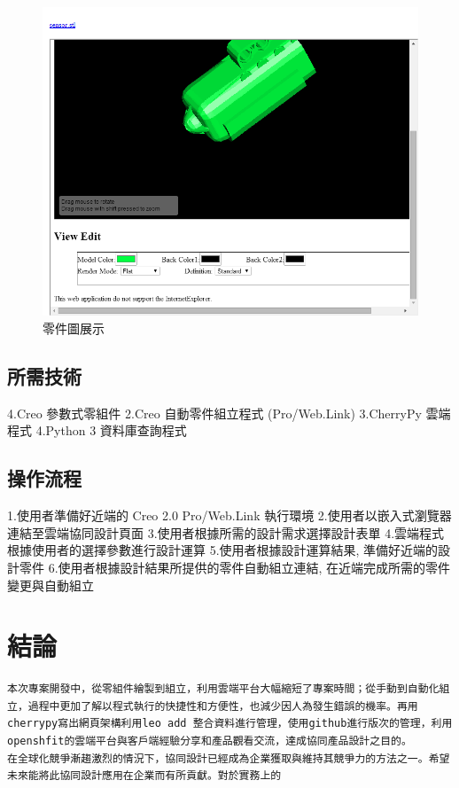\documentclass[]{article}
\begin{document}
\begin{figure}[htbp]
\centering
\includegraphics{./../images/2ag7/cdag7_02.png}
\caption{零件圖展示}
\end{figure}

\subsection{所需技術}\label{ux6240ux9700ux6280ux8853}

4.Creo 參數式零組件 2.Creo 自動零件組立程式 (Pro/Web.Link) 3.CherryPy
雲端程式 4.Python 3 資料庫查詢程式

\subsection{操作流程}\label{ux64cdux4f5cux6d41ux7a0b}

1.使用者準備好近端的 Creo 2.0 Pro/Web.Link 執行環境
2.使用者以嵌入式瀏覽器連結至雲端協同設計頁面
3.使用者根據所需的設計需求選擇設計表單
4.雲端程式根據使用者的選擇參數進行設計運算 5.使用者根據設計運算結果,
準備好近端的設計零件 6.使用者根據設計結果所提供的零件自動組立連結,
在近端完成所需的零件變更與自動組立

\section{結論}\label{ux7d50ux8ad6}

\begin{verbatim}
本次專案開發中，從零組件繪製到組立，利用雲端平台大幅縮短了專案時間；從手動到自動化組立，過程中更加了解以程式執行的快捷性和方便性，也減少因人為發生錯誤的機率。再用cherrypy寫出網頁架構利用leo add 整合資料進行管理，使用github進行版次的管理，利用openshfit的雲端平台與客戶端經驗分享和產品觀看交流，達成協同產品設計之目的。
在全球化競爭漸趨激烈的情況下，協同設計已經成為企業獲取與維持其競爭力的方法之一。希望未來能將此協同設計應用在企業而有所貢獻。對於實務上的
\end{verbatim}
\end{document}
